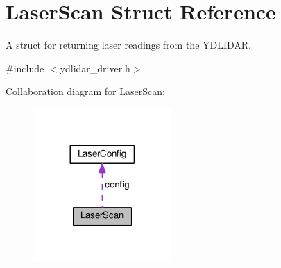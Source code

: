 \hypertarget{struct_laser_scan}{}\section{Laser\+Scan Struct Reference}
\label{struct_laser_scan}


A struct for returning laser readings from the Y\+D\+L\+I\+D\+AR.  




{\ttfamily \#include $<$ydlidar\+\_\+driver.\+h$>$}



Collaboration diagram for Laser\+Scan\+:\nopagebreak
\begin{figure}[H]
\begin{center}
\leavevmode
\includegraphics[width=149pt]{struct_laser_scan__coll__graph}
\end{center}
\end{figure}
